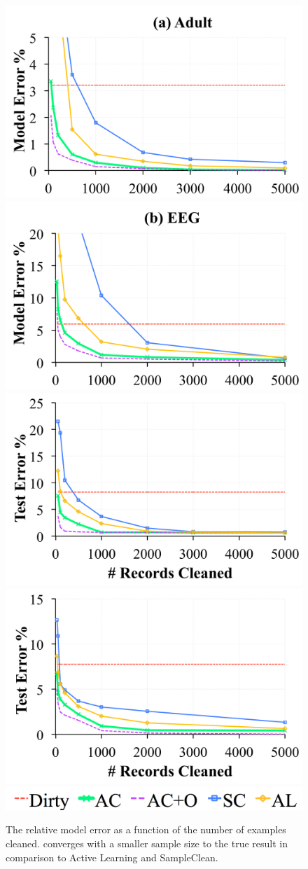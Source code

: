 \begin{figure}[t]
\centering\vspace{-1em}
 \includegraphics[width=0.49\columnwidth]{exp/exp3b.pdf}
  \includegraphics[width=0.49\columnwidth]{exp/exp3c.pdf}
  \includegraphics[width=0.49\columnwidth]{exp/exp3bb.pdf}
  \includegraphics[width=0.49\columnwidth]{exp/exp3cc.pdf}
  \includegraphics[width=0.5\columnwidth]{exp/legend-general.png}\vspace{-0.5em}
 \caption{ The relative model error as a function of the number of examples cleaned. \sys converges with a smaller sample size to the true result in comparison to Active Learning and SampleClean. \label{prio-perf}}\vspace{-1em}
\end{figure}

